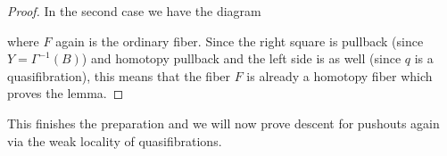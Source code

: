 \begin{lemma}
\begin{proof}
        In the second case we have the diagram
        \begin{center}
        \end{center}
        where $F$ again is the ordinary fiber.
        Since the right square is pullback (since $Y=\Gamma^{-1}(B)$) and homotopy pullback and the left side is as well (since $q$ is a quasifibration), this means that the fiber $F$ is already a homotopy fiber which proves the lemma.
    \end{proof}
\end{lemma}
This finishes the preparation and we will now prove descent for pushouts again via the weak locality of quasifibrations.
